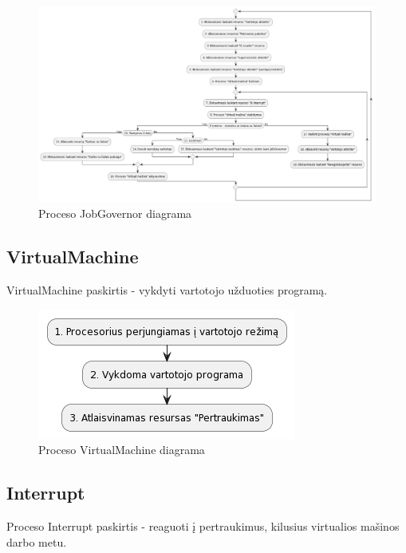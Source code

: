 \documentclass{VUMIFInfKursinis}
\begin{document}
\begin{figure}[H]
	\centering	
	\includegraphics[scale=0.3]{img/JobGovernor}
	\caption{Proceso JobGovernor diagrama}   %
	\label{img:JobGovernor}
\end{figure}

\subsection{VirtualMachine}

VirtualMachine paskirtis - vykdyti vartotojo užduoties programą.

\begin{figure}[H]
	\centering	
	\includegraphics[scale=0.65]{img/VirtualMachine}
	\caption{Proceso VirtualMachine diagrama}   %
	\label{img:VirtualMachine}
\end{figure}

\subsection{Interrupt}

Proceso Interrupt paskirtis - reaguoti į pertraukimus, kilusius virtualios mašinos darbo metu.
\end{document}
